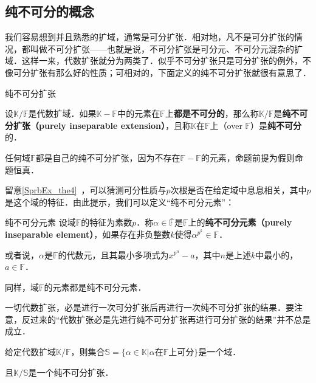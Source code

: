


\subsection{纯不可分的概念}

我们容易想到并且熟悉的扩域，通常是可分扩张．相对地，凡不是可分扩张的情况，都叫做不可分扩张——也就是说，不可分扩张是可分元、不可分元混杂的扩域．这样一来，代数扩张就分为两类了．似乎不可分扩张只是可分扩张的例外，不像可分扩张有那么好的性质；可相对的，下面定义的纯不可分扩张就很有意思了．

\begin{definition}{纯不可分扩张}

设$\mathbb{K}/\mathbb{F}$是代数扩域．如果$\mathbb{K}-\mathbb{F}$中的元素在$\mathbb{F}$上\textbf{都是不可分的}，那么称$\mathbb{K}/\mathbb{F}$是\textbf{纯不可分扩张（purely inseparable extension）}，且称$\mathbb{K}$在$\mathbb{F}$上（over $\mathbb{F}$）是\textbf{纯不可分}的．

\end{definition}

任何域$\mathbb{F}$都是自己的纯不可分扩张，因为不存在$\mathbb{F}-\mathbb{F}$的元素，命题前提为假则命题恒真．

留意\autoref{SprbEx_the4}~，可以猜测可分性质与$p$次根是否在给定域中息息相关，其中$p$是这个域的特征．由此提示，我们可以定义“纯不可分元素”：


\begin{definition}{纯不可分元素}\label{PInsEx_def1}
设域$\mathbb{F}$的特征为素数$p$．称$\alpha\in\overline{\mathbb{F}}$是$\mathbb{F}$上的\textbf{纯不可分元素（purely inseparable element）}，如果存在非负整数$k$使得$\alpha^{p^k}\in\mathbb{F}$．

或者说，$\alpha$是$\mathbb{F}$的代数元，且其最小多项式为$x^{p^n}-a$，其中$n$是上述$k$中最小的，$a\in\mathbb{F}$．
\end{definition}

同样，域$\mathbb{F}$的元素都是纯不可分元素．



一切代数扩张，必是进行一次可分扩张后再进行一次纯不可分扩张的结果．要注意，反过来的“代数扩张必是先进行纯不可分扩张再进行可分扩张的结果”并不总是成立．




\begin{theorem}{}
给定代数扩域$\mathbb{K}/\mathbb{F}$，则集合$\mathbb{S}=\{\alpha\in\mathbb{K}|\alpha\text{在}\mathbb{F}\text{上可分}\}$是一个域．

且$\mathbb{K}/\mathbb{S}$是一个纯不可分扩张．
\end{theorem}

